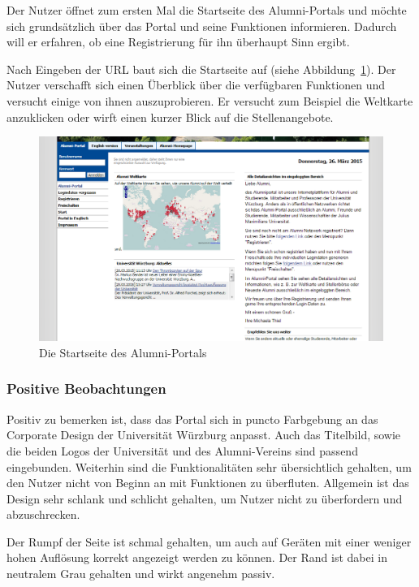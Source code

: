 \newpage
{}
Der Nutzer öffnet zum ersten Mal die Startseite des Alumni-Portals und möchte sich grundsätzlich über das Portal und seine Funktionen informieren. Dadurch will er erfahren, ob eine Registrierung für ihn überhaupt Sinn ergibt. 

Nach Eingeben der URL baut sich die Startseite auf (siehe Abbildung~\ref{fig:start}). Der Nutzer verschafft sich einen Überblick über die verfügbaren Funktionen und versucht einige von ihnen auszuprobieren. Er versucht zum Beispiel die Weltkarte anzuklicken oder wirft einen kurzer Blick auf die Stellenangebote. 

\begin{figure}[h]
	\centering
		\includegraphics[width=\textwidth]{figures/startseite.png}
	\caption{Die Startseite des Alumni-Portals}
	\label{fig:start}
\end{figure}


\subsubsection*{Positive Beobachtungen}
Positiv zu bemerken ist, dass das Portal sich in puncto Farbgebung an das Corporate Design der Universität Würzburg anpasst. 
Auch das Titelbild, sowie die beiden Logos der Universität und des Alumni-Vereins sind passend eingebunden.
Weiterhin sind die Funktionalitäten sehr übersichtlich gehalten, um den Nutzer nicht von Beginn an mit Funktionen zu überfluten. 
Allgemein ist das Design sehr schlank und schlicht gehalten, um Nutzer nicht zu überfordern und abzuschrecken.

Der Rumpf der Seite ist schmal gehalten, um auch auf Geräten mit einer weniger hohen Auflösung korrekt angezeigt werden zu können. Der Rand ist dabei in neutralem Grau gehalten und wirkt angenehm passiv.

